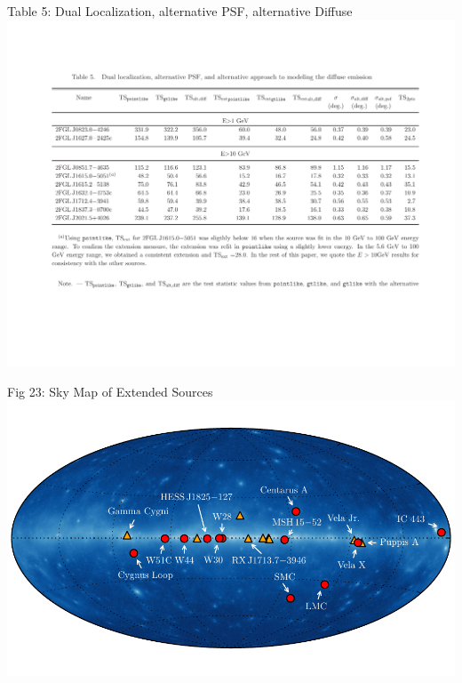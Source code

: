 \documentclass[12pt]{beamer}
\begin{document}
\begin{frame}{Table 5: Dual Localization, alternative PSF, alternative Diffuse}
  \includegraphics[scale=0.40]{plots/alt_diff.pdf}
\end{frame}

\begin{frame}{Fig 23: Sky Map of Extended Sources}
\includegraphics[scale=0.50]{plots/allsky_extended_sources_color.pdf}
\end{frame}
\end{document}
